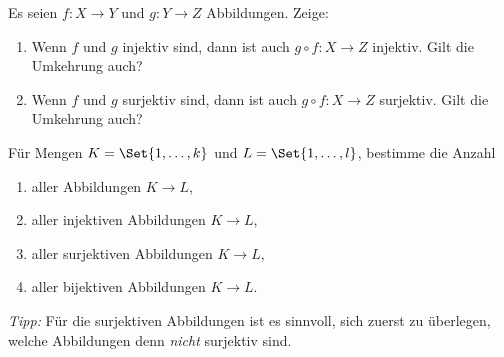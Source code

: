 \begin{prob}
  Es seien $f \colon X \to Y$ und $g \colon Y \to Z$ Abbildungen. Zeige:
  \begin{enumerate}[label=(\alph*)]
  \item Wenn $f$ und $g$ injektiv sind, dann ist auch $g \circ f \colon X \to Z$
    injektiv. Gilt die Umkehrung auch?
  \item Wenn $f$ und $g$ surjektiv sind, dann ist auch $g \circ f \colon X \to Z$
    surjektiv. Gilt die Umkehrung auch?
  \end{enumerate}
\end{prob}

\begin{prob}
  Für Mengen $K = \Set{1, \dots, k}$ und $L = \Set{1, \dots, l}$, bestimme die
  Anzahl
  \begin{enumerate}[label=(\alph*)]
  \item aller Abbildungen $K \to L$,
  \item aller injektiven Abbildungen $K \to L$,
  \item aller surjektiven Abbildungen $K \to L$,
  \item aller bijektiven Abbildungen $K \to L$.
  \end{enumerate}
  \textit{Tipp:} Für die surjektiven Abbildungen ist es sinnvoll, sich zuerst zu
  überlegen, welche Abbildungen denn \textit{nicht} surjektiv sind.
\end{prob}

